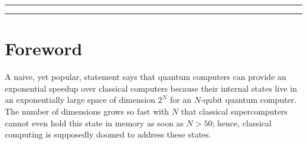 \documentclass{SciPost}
\begin{document}
\vspace{\baselineskip}

\noindent\textcolor{white!90!black}{%
}


\vspace{10pt}
\noindent\rule{\textwidth}{1pt}
\tableofcontents
\noindent\rule{\textwidth}{1pt}
\vspace{10pt}

\section{Foreword}
\label{sec:foreword}

A naive, yet popular, statement says that quantum computers can provide an exponential speedup over classical computers because their internal states live in an exponentially large space of dimension $2^N$ for an $N$-qubit quantum computer. The number of dimensions grows so fast with $N$ that classical supercomputers cannot even hold this state in memory as soon as $N>50$; hence, classical computing is supposedly doomed to address these states.
\end{document}
